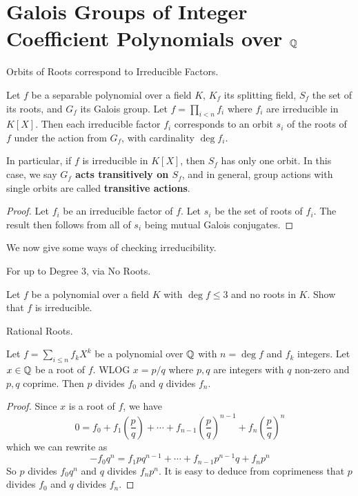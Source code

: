 \documentclass[../book.tex]{subfiles}
\begin{document}
\section{Galois Groups of Integer Coefficient Polynomials over $\mathbb{Q}$}

\begin{thm} Orbits of Roots correspond to Irreducible Factors.
    
    Let $f$ be a separable polynomial over a field $K$,
    $K_f$ its splitting field, $S_f$ the set of its roots, and $G_f$ its Galois group.
    Let $f = \prod_{i<n} f_i$ where $f_i$ are irreducible in $K[X]$.
    Then each irreducible factor $f_i$ corresponds 
    to an orbit $s_i$ of the roots of $f$ under the action from $G_f$,
    with cardinality $\deg f_i$. 
    
    In particular, if $f$ is irreducible in $K[X]$, 
    then $S_f$ has only one orbit. 
    In this case, we say \textbf{$G_f$ acts transitively on $S_f$},
    and in general, group actions with single orbits are called 
    \textbf{transitive actions}. 
    
\end{thm}
\begin{proof}
    
    Let $f_i$ be an irreducible factor of $f$. 
    Let $s_i$ be the set of roots of $f_i$.
    The result then follows from all of $s_i$ being mutual Galois conjugates. 
\end{proof}

We now give some ways of checking irreducibility. 

\begin{ex} For up to Degree 3, via No Roots.
    
    Let $f$ be a polynomial over a field $K$
    with $\deg f \leq 3$ and no roots in $K$. 
    Show that $f$ is irreducible.
    
\end{ex}
\begin{thm} Rational Roots.
    
    Let $f = \sum_{i \leq n} f_k X^k$ be a polynomial over $\mathbb{Q}$ 
    with $n = \deg f$ and $f_k$ integers. 
    Let $x \in \mathbb{Q}$ be a root of $f$. 
    WLOG $x = p/q$ where $p, q$ are integers with $q$ non-zero and $p, q$ coprime. 
    Then $p$ divides $f_0$ and $q$ divides $f_{n}$. 
    
\end{thm}
\begin{proof}
    
    Since $x$ is a root of $f$, we have \[
        0 = f_0 + f_1 \left( \frac{p}{q} \right) + \cdots 
        + f_{n-1} \left( \frac{p}{q} \right)^{n-1}
        + f_n \left( \frac{p}{q} \right)^n
    \]
    which we can rewrite as    
    \[
        - f_0 q^{n} = f_1 p q^{n - 1} + \cdots 
        + f_{n - 1} p^{n - 1} q + f_{n} p^{n}
    \]
    So $p$ divides $f_0 q^n$ and $q$ divides $f_n p^n$. 
    It is easy to deduce from coprimeness that 
    $p$ divides $f_0$ and $q$ divides $f_n$.
    
\end{proof}
\end{document}
